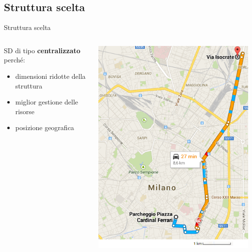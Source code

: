 \subsection*{Struttura scelta}
\begin{frame}{Struttura scelta}
\begin{columns}
\begin{column}{0.6\textwidth}
SD di tipo \textbf{centralizzato} perché:
\begin{itemize}
\item{dimensioni ridotte della struttura}
\item{miglior gestione delle risorse}
\item{posizione geografica}
\end{itemize}
\end{column}
\begin{column}{0.4\textwidth}
\hspace{10mm}
\centering
\includegraphics[scale=0.4]{Images/Maps.png}
\end{column}
\end{columns}
\end{frame}


